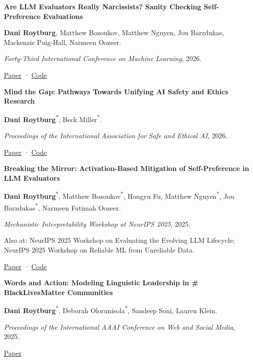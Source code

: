 \documentclass[10pt,letterpaper]{article}
\begin{document}
\textbf{Are LLM Evaluators Really Narcissists? Sanity Checking Self-Preference Evaluations}\par
\textbf{Dani Roytburg}, Matthew Bozoukov, Matthew Nguyen, Jou Barzdukas, Mackenzie Puig-Hall, Narmeen Oozeer.\par
\textit{Forty-Third International Conference on Machine Learning}, 2026.\par
{\small\sffamily \href{https://arxiv.org/abs/2601.22548}{Paper} · \href{https://github.com/djroytburg/sanity_checks_for_self_preference}{Code}}\par\vspace{3pt}
\textbf{Mind the Gap: Pathways Towards Unifying AI Safety and Ethics Research}\par
\textbf{Dani Roytburg}\textsuperscript{*}, Beck Miller\textsuperscript{*}.\par
\textit{Proceedings of the International Association for Safe and Ethical AI}, 2026.\par
{\small\sffamily \href{https://arxiv.org/abs/2512.10058}{Paper} · \href{https://github.com/djroytburg/mind_the_gap}{Code}}\par\vspace{3pt}
\textbf{Breaking the Mirror: Activation-Based Mitigation of Self-Preference in LLM Evaluators}\par
\textbf{Dani Roytburg}\textsuperscript{*}, Matthew Bozoukov\textsuperscript{*}, Hongyu Fu, Matthew Nguyen\textsuperscript{*}, Jou Barzdukas\textsuperscript{*}, Narmeen Fatimah Oozeer.\par
\textit{Mechanistic Interpretability Workshop at NeurIPS 2025}, 2025.\par
{\footnotesize\color{muted}Also at: NeurIPS 2025 Workshop on Evaluating the Evolving LLM Lifecycle; NeurIPS 2025 Workshop on Reliable ML from Unreliable Data.}\par
{\small\sffamily \href{https://arxiv.org/abs/2509.03647}{Paper} · \href{https://github.com/djroytburg/steering_self_preference}{Code}}\par\vspace{3pt}
\textbf{Words and Action: Modeling Linguistic Leadership in \# BlackLivesMatter Communities}\par
\textbf{Dani Roytburg}\textsuperscript{*}, Deborah Olorunisola\textsuperscript{*}, Sandeep Soni, Lauren Klein.\par
\textit{Proceedings of the International AAAI Conference on Web and Social Media}, 2025.\par
{\small\sffamily \href{https://ojs.aaai.org/index.php/ICWSM/article/view/35895}{Paper}}\par\vspace{3pt}
\end{document}
